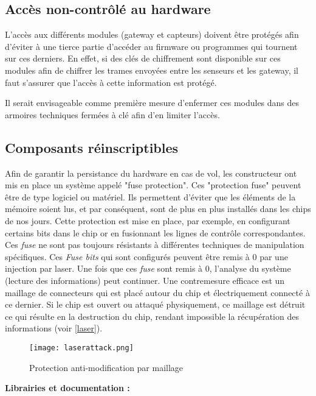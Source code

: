 \subsection{Accès non-contrôlé au hardware}
\label{ssec:cm-acceshardware}

L'accès aux différents modules (gateway et capteurs) doivent être protégés afin d'éviter à une tierce partie d'accéder au firmware ou programmes qui tournent sur ces derniers. En effet, si des clés de chiffrement sont disponible sur ces modules afin de chiffrer les trames envoyées entre les senseurs et les gateway, il faut s'assurer que l'accès à cette information est protégé.

Il serait envisageable comme première mesure d'enfermer ces modules dans des armoires techniques fermées à clé afin d'en limiter l'accès.

\subsection{Composants réinscriptibles}
\label{ssec:cm-fuse}

Afin de garantir la persistance du hardware en cas de vol, les constructeur ont mis en place un système appelé "fuse protection". Ces "protection fuse" peuvent être de type logiciel ou matériel. Ils permettent d'éviter que les éléments de la mémoire soient lus, et par conséquent, sont de plus en plus installés dans les chips de nos jours. Cette protection est mise en place, par exemple, en configurant certains bits dans le chip or en fusionnant les lignes de contrôle correspondantes. Ces \textit{fuse} ne sont pas toujours résistants à différentes techniques de manipulation spécifiques. Ces \textit{Fuse bits} qui sont configurés peuvent être remis à 0 par une injection par laser. Une fois que ces \textit{fuse} sont remis à 0, l'analyse du système (lecture des informations) peut continuer. Une contremesure efficace est un maillage de connecteurs qui est placé autour du chip et électriquement connecté à ce dernier. Si le chip est ouvert ou attaqué physiquement, ce maillage est détruit ce qui résulte en la destruction du chip, rendant impossible la récupération des informations (voir \autoref{laser}).

\begin{figure}[!h]
	\centering
	\texttt{[image: laserattack.png]}
	\caption{Protection anti-modification par maillage}
	\label{laser}
\end{figure}

\medskip
\textbf{Librairies et documentation :}

